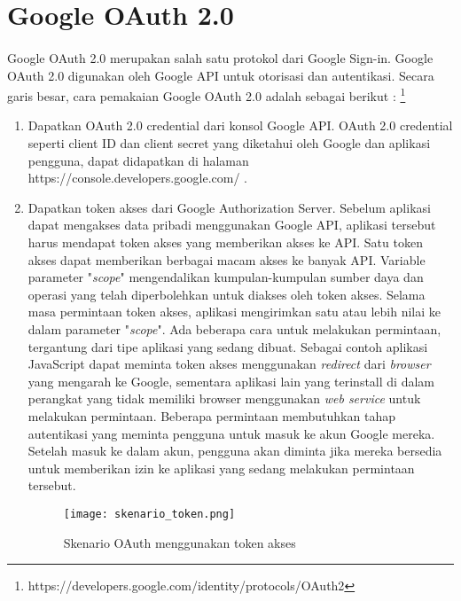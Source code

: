 \section{Google OAuth 2.0} %
\label{googleoauth}

\paragraph{} Google OAuth 2.0 merupakan salah satu protokol dari Google Sign-in. Google OAuth 2.0 digunakan oleh Google API untuk otorisasi dan autentikasi. Secara garis besar, cara pemakaian Google OAuth 2.0 adalah sebagai berikut : \footnote{https://developers.google.com/identity/protocols/OAuth2}

	\begin{enumerate}
  	\item Dapatkan OAuth 2.0 credential dari konsol Google API. OAuth 2.0 credential seperti client ID dan client secret yang diketahui oleh Google dan aplikasi pengguna, dapat didapatkan di halaman https://console.developers.google.com/ . 
  	\item Dapatkan token akses dari Google Authorization Server. Sebelum aplikasi dapat mengakses data pribadi menggunakan Google API, aplikasi tersebut harus mendapat token akses yang memberikan akses ke API. Satu token akses dapat memberikan berbagai macam akses ke banyak API. Variable parameter "\textit{scope}" mengendalikan kumpulan-kumpulan sumber daya dan operasi yang telah diperbolehkan untuk diakses oleh token akses. Selama masa permintaan token akses, aplikasi mengirimkan satu atau lebih nilai ke dalam parameter "\textit{scope}". Ada beberapa cara untuk melakukan permintaan, tergantung dari tipe aplikasi yang sedang dibuat. Sebagai contoh aplikasi JavaScript dapat meminta token akses menggunakan \textit{redirect} dari \textit{browser} yang mengarah ke Google, sementara aplikasi lain yang terinstall di dalam perangkat yang tidak memiliki browser menggunakan \textit{web service} untuk melakukan permintaan. Beberapa permintaan membutuhkan tahap autentikasi yang meminta pengguna untuk masuk ke akun Google mereka. Setelah masuk ke dalam akun, pengguna akan diminta jika mereka bersedia untuk memberikan izin ke aplikasi yang sedang melakukan permintaan tersebut.
  	\begin{figure} [H]
	\centering  
	\texttt{[image: skenario\_token.png]}  
	\caption[Skenario OAuth menggunakan token akses]{Skenario OAuth menggunakan token akses} 
	\label{fig:skenario-token} 

\end{figure}
\end{enumerate}
